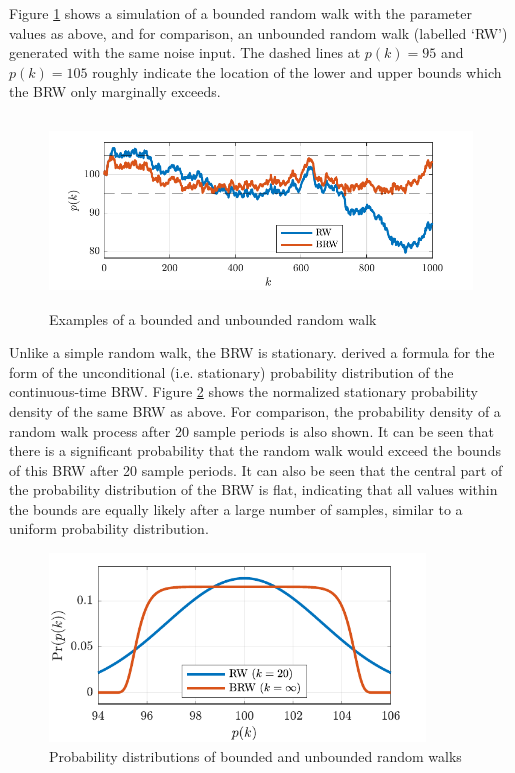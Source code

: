 Figure \ref{fig:brw-sim} shows a simulation of a bounded random walk with the parameter values as above, and for comparison, an unbounded random walk (labelled `RW') generated with the same noise input. The dashed lines at $p(k)=95$ and $p(k)=105$ roughly indicate the location of the lower and upper bounds which the BRW only marginally exceeds.

\begin{figure}[htp]
	\centering
	\includegraphics[height=5cm]{images/brw_sim.pdf}
	\caption{Examples of a bounded and unbounded random walk}
	\label{fig:brw-sim}
\end{figure}

Unlike a simple random walk, the BRW is stationary. \cite{nicolau_stationary_2002} derived a formula for the form of the unconditional (i.e. stationary) probability distribution of the continuous-time BRW. Figure \ref{fig:brw-pdf} shows the normalized stationary probability density of the same BRW as above. For comparison, the probability density of a random walk process after 20 sample periods is also shown. It can be seen that there is a significant probability that the random walk would exceed the bounds of this BRW after 20 sample periods. It can also be seen that the central part of the probability distribution of the BRW is flat, indicating that all values within the bounds are equally likely after a large number of samples, similar to a uniform probability distribution.


\begin{figure}[htp]
	\centering
	\includegraphics[height=5cm]{images/brw_pdf.pdf}
	\caption{Probability distributions of bounded and unbounded random walks}
	\label{fig:brw-pdf}
\end{figure}

